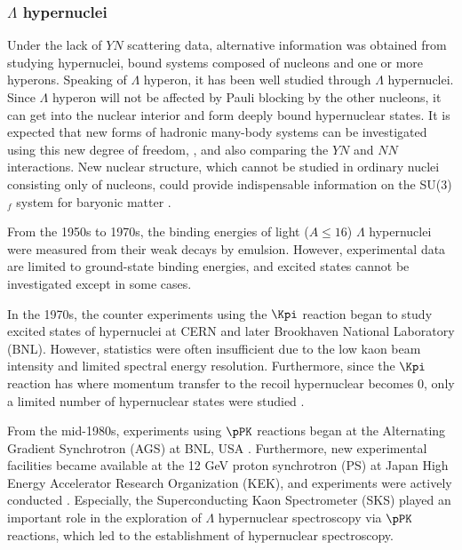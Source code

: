 \subsubsection{$\Lambda$ hypernuclei}
Under the lack of $YN$ scattering data, alternative information was obtained from studying hypernuclei, bound systems composed of nucleons and one or more hyperons. Speaking of $\Lambda$ hyperon, it has been well studied through $\Lambda$ hypernuclei. Since $\Lambda$ hyperon will not be affected by Pauli blocking by the other nucleons, it can get into the nuclear interior and form deeply bound hypernuclear states. It is expected that new forms of hadronic many-body systems can be investigated using this new degree of freedom, , and also comparing the $YN$ and $NN$ interactions. New nuclear structure, which cannot be studied in ordinary nuclei consisting only of nucleons, could provide indispensable information on the SU(3)$_f$ system for baryonic matter \cite{Hashi-Tamu}.

From the 1950s to 1970s, the binding energies of light ($A\leq16$) $\Lambda$ hypernuclei were measured from their weak decays by emulsion. However, experimental data are limited to ground-state binding energies, and excited states cannot be investigated except in some cases. 

In the 1970s, the counter experiments using the $\Kpi$ reaction began to study excited states of hypernuclei at CERN and later Brookhaven National Laboratory (BNL). However, statistics were often insufficient due to the low kaon beam intensity and limited spectral energy resolution. Furthermore, since the $\Kpi$ reaction has  where momentum transfer to the recoil hypernuclear becomes 0, only a limited number of hypernuclear states were studied \cite{Kpi-1973, Kpi-1975, Kpi-1976, Kpi-1978, Kpi-1979, Kpi-1981, Kpi-1979-2, Kpi-1981-2, Kpi-1973-2}.

From the mid-1980s, experiments using $\pPK$ reactions began at the Alternating Gradient Synchrotron (AGS) at BNL, USA \cite{pPK-1985, pPK-1991}. Furthermore, new experimental facilities became available at the 12 GeV proton synchrotron (PS) at Japan High Energy Accelerator Research Organization (KEK), and experiments were actively conducted \cite{PS-1991, PS-1995, PS-1996, PS-1998, PS-2001}. Especially, the Superconducting Kaon Spectrometer (SKS) played an important role in the exploration of $\Lambda$ hypernuclear spectroscopy via $\pPK$ reactions, which led to the establishment of hypernuclear spectroscopy.

